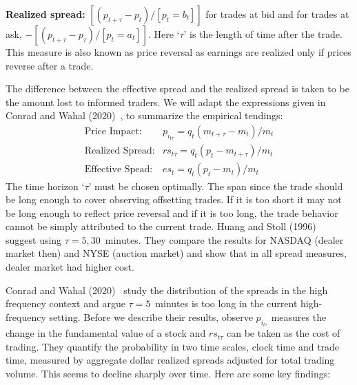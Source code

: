 \pagebreak



\noindent\textbf{Realized spread:} $[(p_{t+ \tau} - p_t)/[p_t= b_t]]$ for trades at bid and for trades at ask, $-[(p_{t+ \tau} - p_\tau)/[p_t= a_t]]$. Here `$\tau$' is the length of time after the trade. This measure is also known as price reversal as earnings are realized only if prices reverse after a trade. \twomedskip


The difference between the effective spread and the realized spread is taken to be the amount lost to informed traders. We will adapt the expressions given in Conrad and Wahal (2020)~\cite{wahal2020}, to summarize the empirical tendings: 
        \begin{equation} \label{eqn:trends}
        \begin{aligned}
        \text{Price Impact:}& p_{i_{t \tau}}= q_t (m_{t+\tau} - m_t)/m_t \\
        \text{Realized Spread:}& r s_{t \tau}= q_t (p_t - m_{t + \tau})/m_t \\
        \text{Effective Spead:}& es_t= q_t (p_t - m_t)/m_t
        \end{aligned}
        \end{equation}
The time horizon `$\tau$' must be chosen optimally. The span since the trade should be long enough to cover observing offsetting trades. If it is too short it may not be long enough to reflect price reversal and if it is too long, the trade behavior cannot be simply attributed to the current trade. Huang and Stoll (1996)~\cite{huang_stoll1996} suggest using $\tau= 5, 30$~minutes. They compare the results for NASDAQ (dealer market then) and NYSE (auction market) and show that in all spread measures, dealer market had higher cost. 


Conrad and Wahal (2020)~\cite{wahal2020} study the distribution of the spreads in the high frequency context and argue $\tau= 5$~minutes is too long in the current high-frequency setting. Before we describe their results, observe $p_{i_{t \tau}}$ measures the change in the fundamental value of a stock and $rs_{t \tau}$ can be taken as the cost of trading. They quantify the probability in two time scales, clock time and trade time, measured by aggregate dollar realized spreads adjusted for total trading volume. This seems to decline sharply over time. Here are some key findings: 

